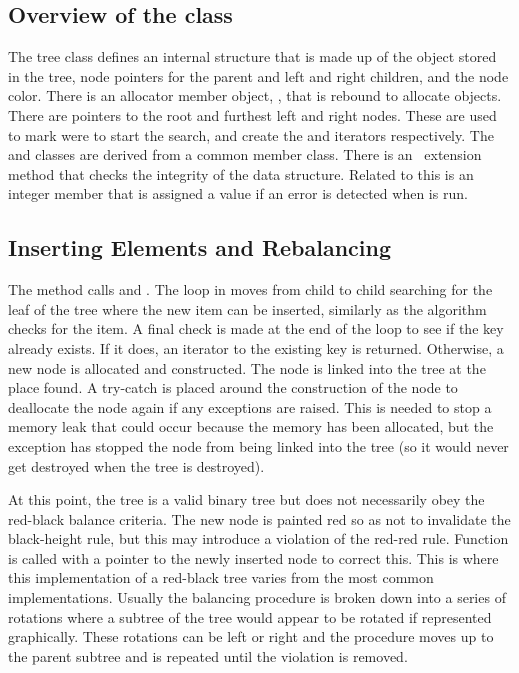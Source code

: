 \subsection{Overview of the class}

The tree class defines an internal  structure that is made up of
the object stored in the tree, node pointers for the parent and left and right
children, and the node color. There is an allocator member object,
, that is rebound to allocate  objects. There are
pointers to the root and furthest left and right nodes. These are used to mark
were to start the search, and create the  and  iterators
respectively. The  and  classes are
derived from a common member class. There is an \OW\ extension method
 that checks the integrity of the data structure. Related to
this is an integer  member that is assigned a value if an error
is detected when  is run. 

\subsection{Inserting Elements and Rebalancing}

The  method calls  and
. The loop in  moves from child
to child searching for the leaf of the tree where the new item can be
inserted, similarly as the  algorithm checks for the item. A final
check is made at the end of the loop to see if the key already exists. If it
does, an iterator to the existing key is returned. Otherwise, a new node is
allocated and constructed. The node is linked into the tree at the place
found. A try-catch is placed around the construction of the node to deallocate
the node again if any exceptions are raised. This is needed to stop a memory
leak that could occur because the memory has been allocated, but the exception
has stopped the node from being linked into the tree (so it would never get
destroyed when the tree is destroyed).

At this point, the tree is a valid binary tree but does not necessarily obey
the red-black balance criteria. The new node is painted red so as not to
invalidate the black-height rule, but this may introduce a violation of the
red-red rule. Function  is called with a pointer to the
newly inserted node to correct this. This is where this implementation of a
red-black tree varies from the most common implementations. Usually the
balancing procedure is broken down into a series of rotations where a subtree
of the tree would appear to be rotated if represented graphically. These
rotations can be left or right and the procedure moves up to the parent
subtree and is repeated until the violation is removed.

